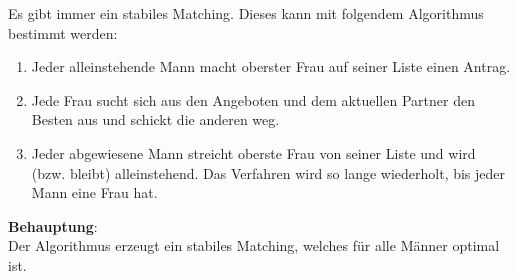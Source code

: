 Es gibt immer ein stabiles Matching.
Dieses kann mit folgendem Algorithmus bestimmt werden:
\begin{enumerate}
    \item
    Jeder alleinstehende Mann macht oberster Frau auf seiner Liste einen
    Antrag.
    
    \item Jede Frau sucht sich aus den Angeboten und dem aktuellen Partner
    den Besten aus und schickt die anderen weg.
    
    \item Jeder abgewiesene Mann streicht oberste Frau von seiner Liste
    und wird (bzw. bleibt) alleinstehend.
    Das Verfahren wird so lange wiederholt, bis jeder Mann eine Frau hat.
\end{enumerate}

\textbf{Behauptung}: \\
Der Algorithmus erzeugt ein stabiles Matching, welches für alle Männer
optimal ist.

